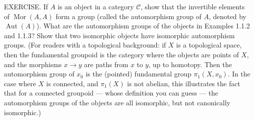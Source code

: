 EXERCISE. If $A$ is an object in a category $\mathcal{C}$, show that the invertible elements of $\operatorname{Mor}(A,A)$ form a group (called the automorphism group of $A$, denoted by $\operatorname{Aut}(A)$). What are the automorphism groups of the objects in Examples 1.1.2 and 1.1.3? Show that two isomorphic objects have isomorphic automorphism groups. (For readers with a topological background: if $X$ is a topological space, then the fundamental groupoid is the category where the objects are points of $X$, and the morphisms $x \to y$ are paths from $x$ to $y$, up to homotopy. Then the automorphism group of $x_0$ is the (pointed) fundamental group $\pi_1(X,x_0)$. In the case where $X$ is connected, and $\pi_1(X)$ is not abelian, this illustrates the fact that for a connected groupoid — whose definition you can guess — the automorphism groups of the objects are all isomorphic, but not canonically isomorphic.)
